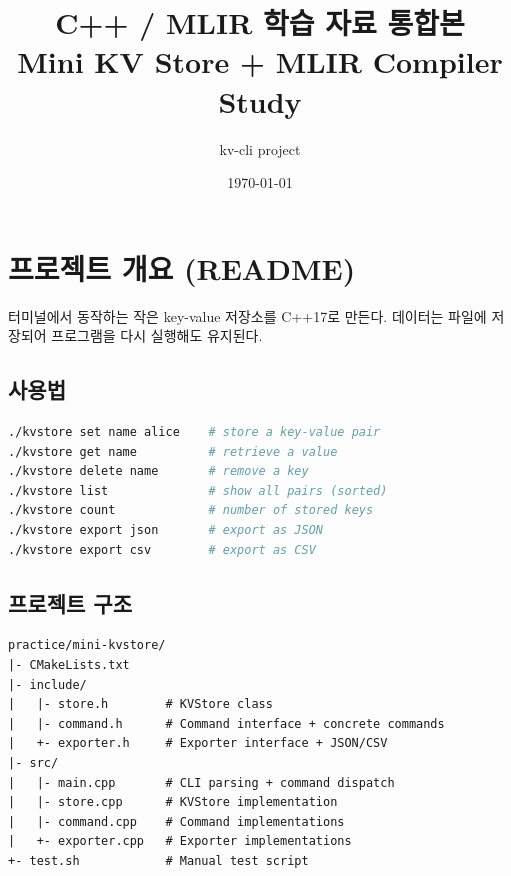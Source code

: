 \documentclass[11pt,a4paper]{article}
\title{\Huge\bfseries C++ / MLIR 학습 자료 통합본\\[0.5em]\large Mini KV Store + MLIR Compiler Study}
\author{kv-cli project}
\date{\today}
\begin{document}
\maketitle
\tableofcontents
\newpage

\section{프로젝트 개요 (README)}

터미널에서 동작하는 작은 key-value 저장소를 C++17로 만든다. 데이터는 파일에 저장되어 프로그램을 다시 실행해도 유지된다.

\subsection{사용법}
\begin{lstlisting}[language=bash]
./kvstore set name alice    # store a key-value pair
./kvstore get name          # retrieve a value
./kvstore delete name       # remove a key
./kvstore list              # show all pairs (sorted)
./kvstore count             # number of stored keys
./kvstore export json       # export as JSON
./kvstore export csv        # export as CSV
\end{lstlisting}

\subsection{프로젝트 구조}
\begin{lstlisting}
practice/mini-kvstore/
|- CMakeLists.txt
|- include/
|   |- store.h        # KVStore class
|   |- command.h      # Command interface + concrete commands
|   +- exporter.h     # Exporter interface + JSON/CSV
|- src/
|   |- main.cpp       # CLI parsing + command dispatch
|   |- store.cpp      # KVStore implementation
|   |- command.cpp    # Command implementations
|   +- exporter.cpp   # Exporter implementations
+- test.sh            # Manual test script
\end{lstlisting}
\end{document}
